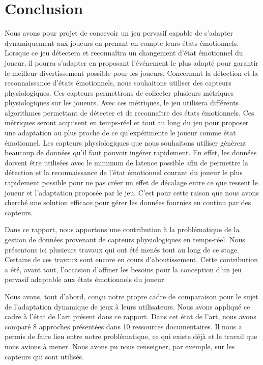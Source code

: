 \documentclass[11pt]{article}
\begin{document}
\section{Conclusion}\label{sec:conclusion}
	Nous avons pour projet de concevoir un jeu pervasif capable de s'adapter dynamiquement aux joueurs en prenant en compte leurs états émotionnels.
	Lorsque ce jeu détectera et reconnaîtra un changement d'état émotionnel du joueur, il pourra s'adapter en proposant l'événement le plus adapté pour garantir le meilleur divertissement possible pour les joueurs.
	Concernant la détection et la reconnaissance d'états émotionnels, nous souhaitons utiliser des capteurs physiologiques.
	Ces capteurs permettrons de collecter plusieurs métriques physiologiques sur les joueurs.
	Avec ces métriques, le jeu utilisera différents algorithmes permettant de détecter et de reconnaître des états émotionnels.
	Ces métriques seront acquisent en temps-réel et tout au long du jeu pour proposer une adaptation au plus proche de ce qu'expérimente le joueur comme état émotionnel.
	Les capteurs physiologiques que nous souhaitons utiliser génèrent beaucoup de données qu'il faut pouvoir ingérer rapidement.
	En effet, les données doivent être utilisées avec le minimum de latence possible afin de permettre la détection et la reconnaissance de l'état émotionnel courant du joueur le plus rapidement possible pour ne pas créer un effet de décalage entre ce que ressent le joueur et l'adaptation proposée par le jeu.
	C'est pour cette raison que nous avons cherché une solution efficace pour gérer les données fournies en continu par des capteurs.\par
	Dans ce rapport, nous apportons une contribution à la problématique de la gestion de données provenant de capteurs physiologiques en temps-réel.
	Nous présentons ici plusieurs travaux qui ont été menés tout au long de ce stage.
	Certains de ces travaux sont encore en cours d'aboutissement.
	Cette contribution a été, avant tout, l'occasion d'affiner les besoins pour la conception d'un jeu pervasif adaptable aux états émotionnels du joueur.\par
	Nous avons, tout d'abord, conçu notre propre cadre de comparaison pour le sujet de l'adaptation dynamique de jeux à leurs utilisateurs.
	Nous avons appliqué ce cadre à l'état de l'art présent dans ce rapport.
	Dans cet état de l'art, nous avons comparé 8 approches présentées dans 10 ressources documentaires.
	Il nous a permis de faire lien entre notre problématique, ce qui existe déjà et le travail que nous avions à mener.
	Nous avons pu nous renseigner, par exemple, sur les capteurs qui sont utilisés.
\end{document}
